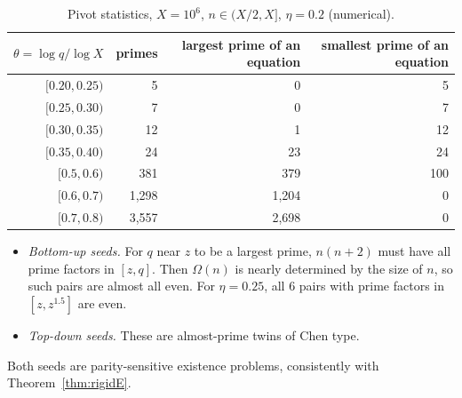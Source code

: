 \documentclass[11pt]{amsart}
\theoremstyle{definition}
\theoremstyle{remark}
\begin{document}
\begin{table}[h]
\centering\small
\begin{tabular}{rrrr}
\toprule
$\theta=\log q/\log X$ & primes & largest prime of an equation & smallest prime of an equation\\
\midrule
$[0.20,0.25)$ & 5 & 0 & 5\\
$[0.25,0.30)$ & 7 & 0 & 7\\
$[0.30,0.35)$ & 12 & 1 & 12\\
$[0.35,0.40)$ & 24 & 23 & 24\\
$[0.5,0.6)$ & 381 & 379 & 100\\
$[0.6,0.7)$ & 1{,}298 & 1{,}204 & 0\\
$[0.7,0.8)$ & 3{,}557 & 2{,}698 & 0\\
\bottomrule
\end{tabular}
\caption{Pivot statistics, $X=10^6$, $n\in(X/2,X]$, $\eta=0.2$ (numerical).}\label{tab:pivots}
\end{table}

\begin{itemize}
\item \emph{Bottom-up seeds.} For $q$ near $z$ to be a largest prime, $n(n+2)$ must have all prime factors in $[z,q]$. Then $\Omega(n)$ is nearly determined by the size of $n$, so such pairs are almost all even. For $\eta=0.25$, all $6$ pairs with prime factors in $[z,z^{1.5}]$ are even.
\item \emph{Top-down seeds.} These are almost-prime twins of Chen type.
\end{itemize}
Both seeds are parity-sensitive existence problems, consistently with Theorem~\ref{thm:rigidE}.
\end{document}
